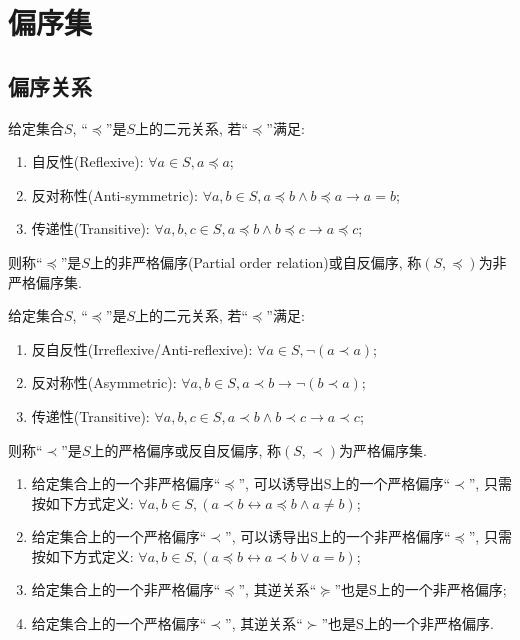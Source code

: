 \chapter{偏序集}
\section{偏序关系}

\begin{definition}[偏序关系]
给定集合$S$, ``$\preccurlyeq$''是$S$上的二元关系, 若``$\preccurlyeq$''满足:
\begin{enumerate}
	\item 自反性(Reflexive): $\forall a\in S, a\preccurlyeq a$;
	\item 反对称性(Anti-symmetric): $\forall a,b\in S, a\preccurlyeq b\wedge b\preccurlyeq a\rightarrow a=b$;
	\item 传递性(Transitive): $\forall a,b,c\in S, a\preccurlyeq b\wedge b\preccurlyeq c\rightarrow a\preccurlyeq c$;
\end{enumerate}
则称``$\preccurlyeq$''是$S$上的非严格偏序(Partial order relation)或自反偏序, 称$(S,\preccurlyeq)$为非严格偏序集.
\end{definition}

\begin{definition}[严格偏序关系]
	给定集合$S$, ``$\preccurlyeq$''是$S$上的二元关系, 若``$\preccurlyeq$''满足:
	\begin{enumerate}
		\item 反自反性(Irreflexive/Anti-reflexive): $\forall a\in S, \neg(a\prec a)$;
		\item 反对称性(Asymmetric): $\forall a,b\in S, a\prec b\rightarrow\neg(b\prec a)$;
		\item 传递性(Transitive): $\forall a,b,c\in S, a\prec b\wedge b\prec c\rightarrow a\prec c$;
	\end{enumerate}
	则称``$\prec$''是$S$上的严格偏序或反自反偏序, 称$(S,\prec)$为严格偏序集.
\end{definition}

\begin{proposition}
	\begin{enumerate}
		\item 给定集合上的一个非严格偏序``$\preccurlyeq$'', 可以诱导出S上的一个严格偏序``$\prec$'', 只需按如下方式定义: $\forall a,b\in S, (a\prec b\leftrightarrow a\preccurlyeq b \wedge a\neq b)$;
		\item 给定集合上的一个严格偏序``$\prec$'', 可以诱导出S上的一个非严格偏序``$\preccurlyeq$'', 只需按如下方式定义: $\forall a,b\in S, (a\preccurlyeq b\leftrightarrow a\prec b \vee a=b)$;
		\item 给定集合上的一个非严格偏序``$\preccurlyeq$'', 其逆关系``$\succcurlyeq$''也是S上的一个非严格偏序;
		\item 给定集合上的一个严格偏序``$\prec$'', 其逆关系``$\succ$''也是S上的一个非严格偏序.
	\end{enumerate}
\end{proposition}

